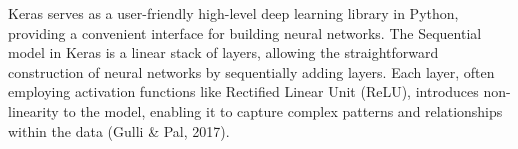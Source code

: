 Keras serves as a user-friendly high-level deep learning library in Python, providing a convenient interface for building neural networks. The Sequential model in Keras is a linear stack of layers, allowing the straightforward construction of neural networks by sequentially adding layers. Each layer, often employing activation functions like Rectified Linear Unit (ReLU), introduces non-linearity to the model, enabling it to capture complex patterns and relationships within the data (Gulli \& Pal, 2017). 
